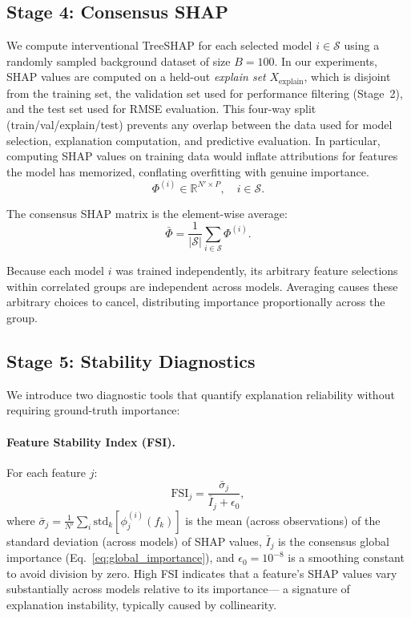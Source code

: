 \documentclass[10pt]{article}
\begin{document}
\subsection{Stage 4: Consensus SHAP}

We compute interventional TreeSHAP \citep{lundberg2020local} for each
selected model $i \in \mathcal{S}$ using a randomly sampled background
dataset of size $B = 100$. In our experiments, SHAP values are computed
on a held-out \emph{explain set} $X_{\text{explain}}$, which is disjoint
from the training set, the validation set used for performance filtering
(Stage~2), and the test set used for RMSE evaluation. This four-way split
(train/val/explain/test) prevents any overlap between the data used for
model selection, explanation computation, and predictive evaluation.
In particular, computing SHAP values on training data would inflate
attributions for features the model has memorized, conflating
overfitting with genuine importance.
\begin{equation}
  \Phi^{(i)} \in \mathbb{R}^{N' \times P}, \quad i \in \mathcal{S}.
\end{equation}

The consensus SHAP matrix is the element-wise average:
\begin{equation}
  \bar{\Phi} = \frac{1}{|\mathcal{S}|} \sum_{i \in \mathcal{S}} \Phi^{(i)}.
  \label{eq:consensus}
\end{equation}

Because each model $i$ was trained independently, its arbitrary feature
selections within correlated groups are independent across models.
Averaging causes these arbitrary choices to cancel, distributing
importance proportionally across the group.

\subsection{Stage 5: Stability Diagnostics}

We introduce two diagnostic tools that quantify explanation reliability
without requiring ground-truth importance:

\paragraph{Feature Stability Index (FSI).}
For each feature $j$:
\begin{equation}
  \text{FSI}_j = \frac{\bar{\sigma}_j}{\bar{I}_j + \epsilon_0},
  \label{eq:fsi}
\end{equation}
where $\bar{\sigma}_j = \frac{1}{N'}\sum_i \text{std}_k[\phi_j^{(i)}(f_k)]$
is the mean (across observations) of the standard deviation (across models)
of SHAP values, $\bar{I}_j$ is the consensus global importance
(Eq.~\ref{eq:global_importance}), and $\epsilon_0 = 10^{-8}$ is a smoothing
constant to avoid division by zero. High FSI indicates that a feature's
SHAP values vary substantially across models relative to its importance---
a signature of explanation instability, typically caused by collinearity.
\end{document}
